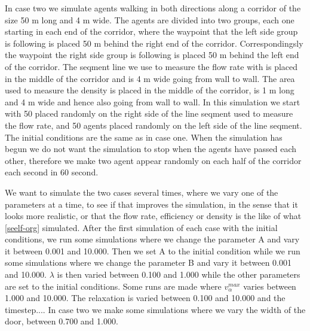In case two we simulate agents walking in both directions along a corridor of the size 50 m long and 4 m wide.
The agents are divided into two groups, each one starting in each end of the corridor, where the waypoint that the
left side group is following is placed 50 m behind the right end of the corridor. Correspondingsly the waypoint
the right side group is following is placed 50 m behind the left end of the corridor.
The seqment line we use to measure the flow rate with is placed in the middle of the corridor and is 4 m wide going from wall to wall.
The area used to measure the density is placed in the middle of the corridor, is 1 m long and 4 m wide and hence
also going from wall to wall.
In this simulation we start with 50 placed randomly on the right side of the line seqment used to measure the flow rate,
and 50 agents placed randomly on the left side of the line seqment.
The initial conditions are the same as in case one.
When the simulation has begun we do not want the simulation to stop when the agents have passed each other, therefore we
make two agent appear randomly on each half of the corridor each second in 60 second.

We want to simulate the two cases several times, where we vary one of the parameters at a time, to see if that improves the simulation,
in the sense that it looks more realistic, or that the flow rate, efficiency or density is the like of what \ref{seelf-org} simulated.
After the first simulation of each case with the initial conditions, we run some simulations where we change the parameter A and vary
it between 0.001 and 10.000.
Then we set A to the initial condition while we run some simulations where we change the parameter B and vary it between 0.001 and 10.000.
$\lambda$ is then varied between 0.100 and 1.000 while the other parameters are set to the initial conditions.
Some runs are made where $v^{max}_{\alpha}$ varies between 1.000 and 10.000.
The relaxation is varied between 0.100 and 10.000 and the timestep....
In case two we make some simulations where we vary the width of the door, between 0.700 and 1.000.

